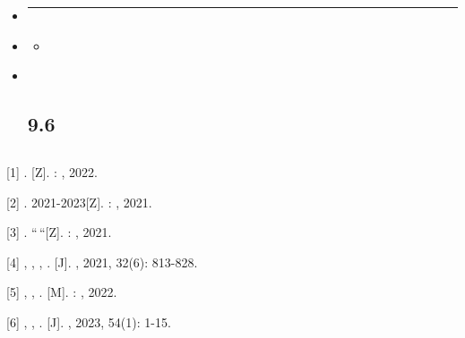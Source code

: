 \begin{itemize}
\item
  \begin{center}\rule{0.5\linewidth}{0.5pt}\end{center}
\item
  \begin{itemize}
  \tightlist
  \item
  \end{itemize}
\item ~
  \subsection{9.6}\label{section-40}
\end{itemize}

\subsection{}\label{section-41}

{[}1{]} . {[}Z{]}. : , 2022.

{[}2{]} . 2021-2023{[}Z{]}. : , 2021.

{[}3{]} . ``\,``{[}Z{]}. : , 2021.

{[}4{]} , , , . {[}J{]}. , 2021, 32(6): 813-828.

{[}5{]} , , . {[}M{]}. : , 2022.

{[}6{]} , , . {[}J{]}. , 2023, 54(1): 1-15.